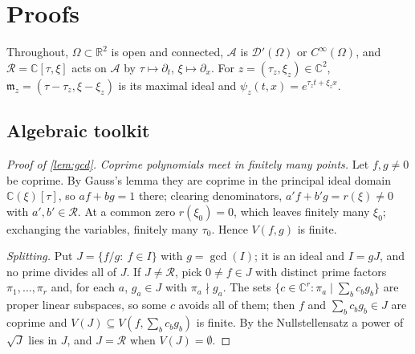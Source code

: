 \documentclass[11pt]{article}
\theoremstyle{plain}
\theoremstyle{definition}
\theoremstyle{remark}
\newcommand{\R}{\mathbb{R}}
\newcommand{\C}{\mathbb{C}}
\newcommand{\ring}{\mathcal{R}}            %
\DeclareMathOperator{\gcdop}{gcd}
\newcommand{\Var}{V}                        %
\begin{document}


\appendix

\section{Proofs}\label{app:proofs}
Throughout, $\Omega\subset\R^2$ is open and connected, $\mathcal A$ is $\mathcal D'(\Omega)$ or $C^\infty(\Omega)$, and
$\ring=\C[\tau,\xi]$ acts on $\mathcal A$ by $\tau\mapsto\partial_t$, $\xi\mapsto\partial_x$. For $z=(\tau_z,\xi_z)\in\C^2$,
$\mathfrak m_z=(\tau-\tau_z,\xi-\xi_z)$ is its maximal ideal and $\psi_z(t,x)=e^{\tau_zt+\xi_zx}$.

\subsection{Algebraic toolkit}
\begin{proof}[Proof of \cref{lem:gcd}]
\emph{Coprime polynomials meet in finitely many points.} Let $f,g\ne0$ be coprime. By Gauss's lemma they are
coprime in the principal ideal domain $\C(\xi)[\tau]$, so $af+bg=1$ there; clearing denominators,
$a'f+b'g=r(\xi)\ne0$ with $a',b'\in\ring$. At a common zero $r(\xi_0)=0$, which leaves finitely many $\xi_0$;
exchanging the variables, finitely many $\tau_0$. Hence $\Var(f,g)$ is finite.

\emph{Splitting.} Put $J=\{f/g:\ f\in I\}$ with $g=\gcdop(I)$; it is an ideal and $I=gJ$, and no prime divides all
of $J$. If $J\ne\ring$, pick $0\ne f\in J$ with distinct prime factors $\pi_1,\dots,\pi_r$ and, for each $a$,
$g_a\in J$ with $\pi_a\nmid g_a$. The sets $\{c\in\C^r:\pi_a\mid\sum_bc_bg_b\}$ are proper linear subspaces, so some
$c$ avoids all of them; then $f$ and $\sum_bc_bg_b\in J$ are coprime and $\Var(J)\subseteq\Var(f,\sum_bc_bg_b)$ is
finite. By the Nullstellensatz a power of $\sqrt J$ lies in $J$, and $J=\ring$ when $\Var(J)=\emptyset$.
\end{proof}
\end{document}
